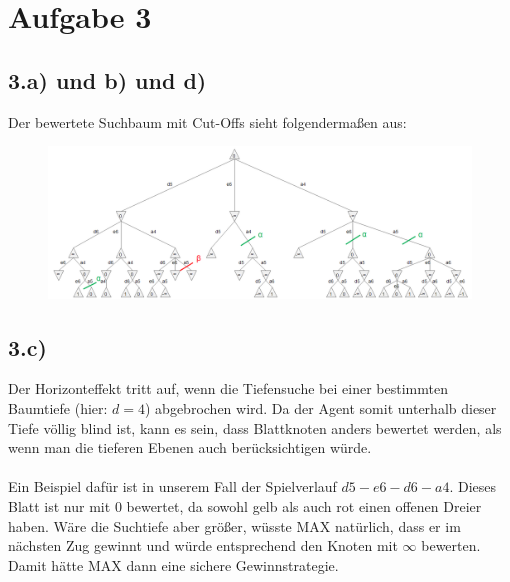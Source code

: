 \documentclass[a4paper]{article}
\begin{document}
\section*{Aufgabe 3}
\subsection*{3.a) und b) und d)}
Der bewertete Suchbaum mit Cut-Offs sieht folgenderma{\ss}en aus:

\begin{figure}[h]
\centering
\includegraphics[width=\columnwidth]{blatt2aufgabe3}
\end{figure}

\subsection*{3.c)}
Der Horizonteffekt tritt auf, wenn die Tiefensuche bei einer bestimmten Baumtiefe (hier: $d=4$) abgebrochen wird. Da der Agent somit unterhalb dieser Tiefe v\"ollig blind ist, kann es sein, dass Blattknoten anders bewertet werden, als wenn man die tieferen Ebenen auch ber\"ucksichtigen w\"urde.\\
\\
Ein Beispiel daf\"ur ist in unserem Fall der Spielverlauf $d5 - e6 - d6 - a4$. Dieses Blatt ist nur mit $0$ bewertet, da sowohl gelb als auch rot einen offenen Dreier haben. W\"are die Suchtiefe aber gr\"o{\ss}er, w\"usste MAX nat\"urlich, dass er im n\"achsten Zug gewinnt und w\"urde entsprechend den Knoten mit $\infty$ bewerten. Damit h\"atte MAX dann eine sichere Gewinnstrategie.
\end{document}
